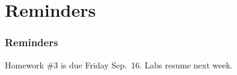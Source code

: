 \documentclass[11pt]{beamer}
\begin{document}
\section{Reminders}

\begin{frame}
  \frametitle{Reminders}
  \Enlarge

  \begin{itemize}
  \myitem  Homework \#3 is due Friday Sep.\ 16.
  \myitem  Labs resume next week.
  \end{itemize}
\end{frame}
\end{document}
